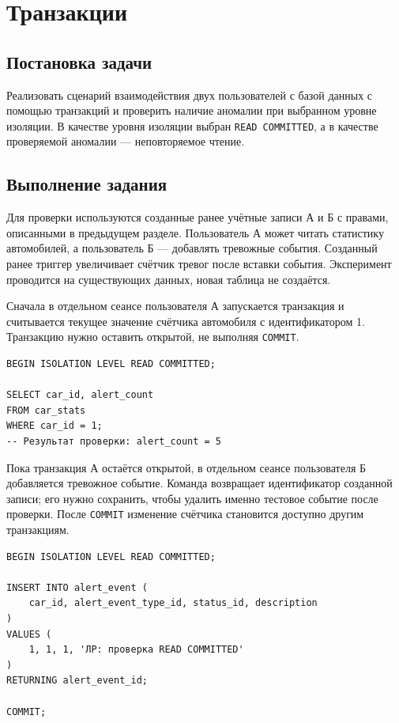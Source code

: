 \clearpage
\section{Транзакции}

\subsection{Постановка задачи}
Реализовать сценарий взаимодействия двух пользователей с базой данных с
помощью транзакций и проверить наличие аномалии при выбранном уровне изоляции.
В качестве уровня изоляции выбран \texttt{READ COMMITTED}, а в качестве
проверяемой аномалии — неповторяемое чтение.

\subsection{Выполнение задания}
Для проверки используются созданные ранее учётные записи А и Б с правами,
описанными в предыдущем разделе. Пользователь А может читать статистику
автомобилей, а пользователь Б — добавлять тревожные события. Созданный ранее
триггер увеличивает счётчик тревог после вставки события. Эксперимент проводится
на существующих данных, новая таблица не создаётся.

Сначала в отдельном сеансе пользователя А запускается транзакция и считывается
текущее значение счётчика автомобиля с идентификатором 1. Транзакцию нужно
оставить открытой, не выполняя \texttt{COMMIT}.

\begin{lstlisting}[style=sqlstyle, caption={Пользователь А: начало транзакции и первое чтение}, label={lst:transaction-a-first}]
BEGIN ISOLATION LEVEL READ COMMITTED;

SELECT car_id, alert_count
FROM car_stats
WHERE car_id = 1;
-- Результат проверки: alert_count = 5
\end{lstlisting}

Пока транзакция А остаётся открытой, в отдельном сеансе пользователя Б
добавляется тревожное событие. Команда возвращает идентификатор созданной
записи; его нужно сохранить, чтобы удалить именно тестовое событие после
проверки. После \texttt{COMMIT} изменение счётчика становится доступно другим
транзакциям.

\begin{lstlisting}[style=sqlstyle, caption={Пользователь Б: добавление тревожного события}, label={lst:transaction-b-insert}]
BEGIN ISOLATION LEVEL READ COMMITTED;

INSERT INTO alert_event (
    car_id, alert_event_type_id, status_id, description
)
VALUES (
    1, 1, 1, 'ЛР: проверка READ COMMITTED'
)
RETURNING alert_event_id;

COMMIT;
\end{lstlisting}

